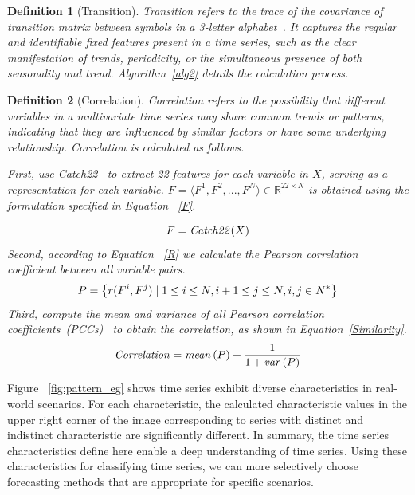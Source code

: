 \documentclass[sigconf, nonacm, pdfa]{acmart}
\newtheorem{definition}{Definition}
\begin{document}
\begin{definition}[Transition]
Transition refers to the trace of the covariance of transition
matrix between symbols in a 3-letter alphabet~\cite{lubba2019catch22}. It captures the regular and identifiable fixed features present in a time series, such as the clear manifestation of trends, periodicity, or the simultaneous presence of both seasonality and trend. Algorithm~\ref{alg2} details the calculation process.
\end{definition}

\begin{definition}[Correlation]
Correlation refers to the possibility that different variables in a multivariate time series may share common trends or patterns, indicating that they are influenced by similar factors or have some underlying relationship.
Correlation is calculated as follows.



First, use Catch22~\cite{lubba2019catch22} to extract 22 features for each variable in $X$, serving as a representation for each variable. $F=\langle F^1,F^2,...,F^N\rangle\in \mathbb{R}^{22\times N}$ is obtained using the formulation specified in Equation ~\ref{F}.

\begin{equation}
\label{F}
\footnotesize
F=\mathit{Catch22}(X)
\end{equation}
Second, according to Equation ~\ref{R} we calculate the Pearson correlation coefficient between all variable pairs. 
\begin{equation}
\label{R}
\footnotesize
P=\left\{r(F^{i},F^{j})\mid 1\leq i\leq N,i+1\leq j\leq N,i,j\in N^{\ast}\right\}
\end{equation}
Third, compute the mean and variance of all Pearson correlation coefficients~(PCCs)~\cite{cohen2009pearson} to obtain the correlation, as shown in Equation~\ref{Similarity}.
\begin{equation}
\label{Similarity}
\footnotesize
\mathit{Correlation}=\mathit{mean}\left(P\right)+\frac{1}{1+\mathit{var}\left(P\right)}
\end{equation}
\end{definition}

Figure ~\ref{fig:pattern_eg} shows time series exhibit diverse characteristics in real-world scenarios. For each characteristic, the calculated characteristic values in the upper right corner of the image corresponding to series with distinct and indistinct characteristic are significantly different.
In summary, the time series characteristics define here enable a deep understanding of time series. Using these characteristics for classifying time series, we can more selectively choose forecasting methods that are appropriate for specific scenarios. 
\end{document}
